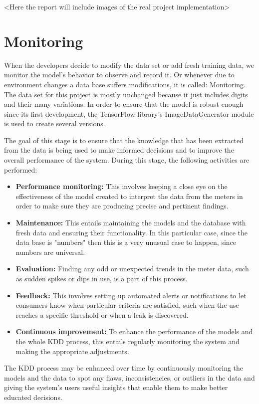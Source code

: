 <Here the report will include images of the real project implementation> 


\section{Monitoring}
When the developers decide to modify the data set or add fresh training data, we monitor the model's behavior to observe and record it. Or whenever due to environment changes a data base suffers modifications, it is called: Monitoring. The data set for this project is mostly unchanged because it just includes digits and their many variations. In order to ensure that the model is robust enough since its first development, the TensorFlow library's ImageDataGenerator module is used to create several versions. 

The goal of this stage is to ensure that the knowledge that has been extracted from the data is being used to make informed decisions and to improve the overall performance of the system. During this stage, the following activities are performed:
\begin{itemize}
	\item \textbf{Performance monitoring:} This involves keeping a close eye on the effectiveness of the model created to interpret the data from the meters in order to make sure they are producing precise and pertinent findings.
	\item \textbf{Maintenance:} This entails maintaining the models and the database with fresh data and ensuring their functionality. In this particular case, since the data base is "numbers" then this is a very unusual case to happen, since numbers are universal.
	\item \textbf{Evaluation:} Finding any odd or unexpected trends in the meter data, such as sudden spikes or dips in use, is a part of this process.
	\item \textbf{Feedback:} This involves setting up automated alerts or notifications to let consumers know when particular criteria are satisfied, such when the use reaches a specific threshold or when a leak is discovered.
	\item \textbf{Continuous improvement:} To enhance the performance of the models and the whole KDD process, this entails regularly monitoring the system and making the appropriate adjustments.
\end{itemize}

The KDD process may be enhanced over time by continuously monitoring the models and the data to spot any flaws, inconsistencies, or outliers in the data and giving the system's users useful insights that enable them to make better educated decisions.

